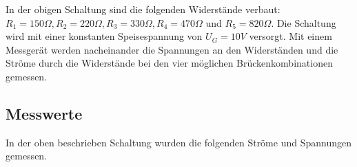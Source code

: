 \documentclass[
a4paper,     %
 headsepline, %
11pt         %
]{scrartcl}  %
\begin{document}
\begin{center}
\end{center}
In der obigen Schaltung sind die folgenden Widerstände verbaut: $R_1 = 150\Omega, R_2 = 220\Omega, R_3=330\Omega, R_4=470\Omega$ und $R_5=820\Omega$.
Die Schaltung wird mit einer konstanten Speisespannung von $U_G=10V$ versorgt. 
Mit einem Messgerät werden nacheinander die Spannungen an den Widerständen und die Ströme durch die Widerstände bei den vier möglichen Brückenkombinationen gemessen.

\subsection{Messwerte}

In der oben beschrieben Schaltung wurden die folgenden Ströme und Spannungen gemessen. 
\end{document}
